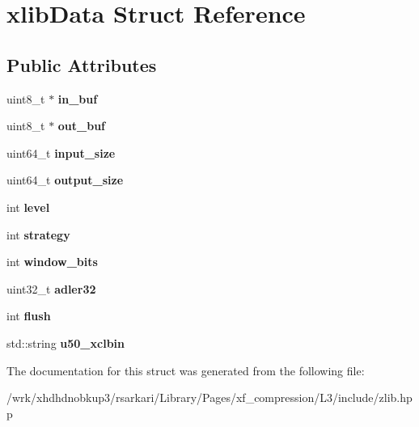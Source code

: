 \hypertarget{structxlibData}{\section{xlib\-Data Struct Reference}
\label{structxlibData}
}
\subsection*{Public Attributes}
\begin{DoxyCompactItemize}
\item 
\hypertarget{structxlibData_a25a95929b7546db2cd5f0dcac955c398}{uint8\-\_\-t $\ast$ {\bfseries in\-\_\-buf}}\label{structxlibData_a25a95929b7546db2cd5f0dcac955c398}

\item 
\hypertarget{structxlibData_affe6e84a5b174855692304be6c373e25}{uint8\-\_\-t $\ast$ {\bfseries out\-\_\-buf}}\label{structxlibData_affe6e84a5b174855692304be6c373e25}

\item 
\hypertarget{structxlibData_a7a176e85c1843a722fa47cb82d759b07}{uint64\-\_\-t {\bfseries input\-\_\-size}}\label{structxlibData_a7a176e85c1843a722fa47cb82d759b07}

\item 
\hypertarget{structxlibData_ad4e9193559fc872f3ed148ddb3b32062}{uint64\-\_\-t {\bfseries output\-\_\-size}}\label{structxlibData_ad4e9193559fc872f3ed148ddb3b32062}

\item 
\hypertarget{structxlibData_ae9403a54b065162b97a38588e85bc32f}{int {\bfseries level}}\label{structxlibData_ae9403a54b065162b97a38588e85bc32f}

\item 
\hypertarget{structxlibData_a80237a47cdb64fe118a8b6eb34c45e07}{int {\bfseries strategy}}\label{structxlibData_a80237a47cdb64fe118a8b6eb34c45e07}

\item 
\hypertarget{structxlibData_a822c511d79a90b76ac605299260e7ded}{int {\bfseries window\-\_\-bits}}\label{structxlibData_a822c511d79a90b76ac605299260e7ded}

\item 
\hypertarget{structxlibData_a60f13588ad585222601a2bcac3380ab0}{uint32\-\_\-t {\bfseries adler32}}\label{structxlibData_a60f13588ad585222601a2bcac3380ab0}

\item 
\hypertarget{structxlibData_a9c4814f8637fa6929fcc40f3632908d5}{int {\bfseries flush}}\label{structxlibData_a9c4814f8637fa6929fcc40f3632908d5}

\item 
\hypertarget{structxlibData_a357a9a7ecd00182a9aa6c9f1222221ba}{std\-::string {\bfseries u50\-\_\-xclbin}}\label{structxlibData_a357a9a7ecd00182a9aa6c9f1222221ba}

\end{DoxyCompactItemize}


The documentation for this struct was generated from the following file\-:\begin{DoxyCompactItemize}
\item 
/wrk/xhdhdnobkup3/rsarkari/\-Library/\-Pages/xf\-\_\-compression/\-L3/include/zlib.\-hpp\end{DoxyCompactItemize}
